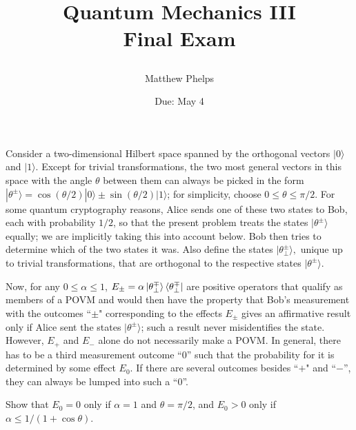 \documentclass[10pt,letterpaper]{article}
\title{\begin{spacing}{1.2}Quantum Mechanics III\\ Final Exam\end{spacing}}
\author{Matthew Phelps}
\date{Due: May 4}
\newcommand{\ra}{\rangle}
\begin{document}
\maketitle
\benum

\item Consider a two-dimensional Hilbert space spanned by the orthogonal vectors $|0\ra$ and $|1\ra$. Except for trivial transformations, the two most general vectors in this space with the angle $\theta$ between them can always be picked in the form $|\theta^\pm\ra=\cos(\theta/2)|0\ra\pm\sin(\theta/2)|1\ra$; for simplicity, choose $0\leq \theta\leq \pi/2$. For some quantum cryptography reasons, Alice sends one of these two states to Bob, each with probability $1/2$, so that the present problem treats the states $|\theta^\pm\ra$ equally; we are implicitly taking this into account below. Bob then tries to determine which of the two states it was. Also define the states $|\theta_\perp^\pm\ra,$ unique up to trivial transformations, that are orthogonal to the respective states $|\theta^\pm\ra$. 

Now, for any $0\leq\alpha\leq 1$, $E_{\pm} = \alpha \ket{\theta^\mp_\perp}\bra{\theta^\mp_\perp}$ are positive operators that qualify as members of a POVM and would then have the property that Bob's measurement with the outcomes ``$\pm$" corresponding to the effects $E_\pm$ gives an affirmative result only if Alice sent the states $|\theta^\pm\ra$; such a result never misidentifies the state. However, $E_+$ and $E_-$ alone do not necessarily make a POVM. In general, there has to be a third measurement outcome ``0'' such that the probability for it is determined by some effect $E_0$. If there are several outcomes besides ``$+$" and ``$-$'', they can always be lumped into such a ``0''.

\benum

\item Show that $E_0=0$ only if $\alpha=1$ and $\theta=\pi/2$, and $E_0>0$ only if $\alpha\leq 1/(1+\cos\theta)$.
	
\end{document}
